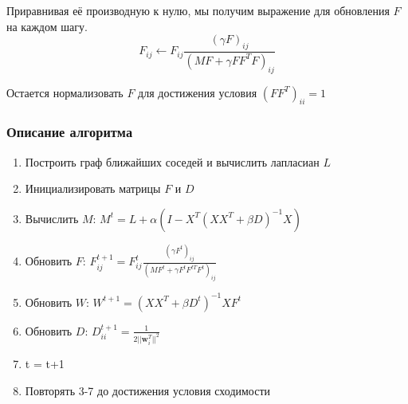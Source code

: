 Приравнивая её производную к нулю, мы получим выражение для обновления $F$ на каждом шагу.
\begin{equation}
	F_{ij} \leftarrow F_{ij} \frac{(\gamma F)_{ij}}{(MF + \gamma F F^T F)_{ij}}
\end{equation}

Остается нормализовать $F$ для достижения условия $(F F^T)_{ii} = 1 $

\subsubsection{Описание алгоритма}
\begin{enumerate}
	\item Построить граф ближайших соседей и вычислить лапласиан $L$
	\item Инициализировать матрицы $F$ и $D$
	\item Вычислить $M$: $M^t = L + \alpha(I - X^T(X X^T + \beta D)^{-1} X)$
	\item Обновить $F$: $F_{ij}^{t+1} = F_{ij}^t \frac{(\gamma F^t)_{ij}}{(MF^t + \gamma F^t F^{tT} F^t)_{ij}}$
	\item Обновить $W$: $ W^{t+1} = (XX^T + \beta D^t)^{-1} X F^t$
	\item Обновить $D$: $D_{ii}^{t+1} = \frac{1}{2 ||\mathbf{w}_i^T||^2}$
	\item t = t+1
	\item Повторять 3-7 до достижения условия сходимости
\end{enumerate}